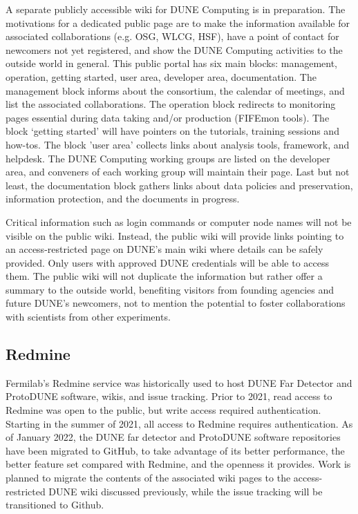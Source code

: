 \documentclass[../main-v1.tex]{subfiles}
\begin{document}
A separate publicly accessible wiki for DUNE Computing is in preparation. The motivations for a dedicated public page are to make the information available for associated collaborations (e.g. OSG, WLCG, HSF), have a point of contact for newcomers not yet registered, and show the DUNE Computing activities to the outside world in general. This public portal has six main blocks: management, operation, getting started, user area, developer area, documentation. The management block informs about the consortium, the calendar of meetings, and list the associated collaborations. The operation block redirects to monitoring pages essential during data taking and/or production (FIFEmon tools). The block ‘getting started’ will have pointers on the tutorials, training sessions and how-tos. The block 'user area' collects links about analysis tools, framework, and helpdesk. The DUNE Computing working groups are listed on the developer area, and conveners of each working group will maintain their page. Last but not least, the documentation block gathers links about data policies and preservation, information protection, and the documents in progress.

Critical information such as login commands or computer node names will not be visible on the public wiki. Instead, the public wiki will provide links pointing to an access-restricted page on DUNE’s main wiki where details can be safely provided. Only users with approved DUNE credentials will be able to access them. The public wiki will not duplicate the information but rather offer a summary to the outside world, benefiting visitors from founding agencies and future DUNE’s newcomers, not to mention the potential to foster collaborations with scientists from other experiments.


\subsection{Redmine}

Fermilab's Redmine service was historically used to host DUNE Far Detector and ProtoDUNE software, wikis, and issue tracking.  Prior to 2021, read access to Redmine was open to the public, but write access required authentication.  Starting in the summer of 2021, all access to Redmine requires authentication.  As of January 2022, the DUNE far detector and ProtoDUNE software repositories have been migrated to GitHub, to take advantage of its better performance, the better feature set compared with Redmine, and the openness it provides. Work is planned to migrate the contents of the associated wiki pages to the access-restricted DUNE wiki discussed previously, while the issue tracking will be transitioned to Github.
\end{document}
